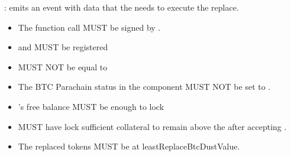 \documentclass[a4paper,10pt,english]{sphinxmanual}
\begin{document}

: emits an event with data that the  needs to execute the replace.

\begin{itemize}
\item {} 
The function call MUST be signed by .

\item {} 
 and  MUST be registered

\item {} 
 MUST NOT be equal to 

\item {} 
The BTC Parachain status in the {\hyperref[\detokenize{spec/security:security}]{}} component MUST NOT be set to .

\item {} 
’s free balance MUST be enough to lock 

\item {} 
 MUST have lock sufficient collateral to remain above the {\hyperref[\detokenize{spec/vault-registry:securecollateralthreshold}]{}} after accepting .

\item {} 
The replaced tokens MUST be at least\textasciigrave{}\textasciigrave{}ReplaceBtcDustValue\textasciigrave{}\textasciigrave{}.

\end{itemize}

\end{document}
